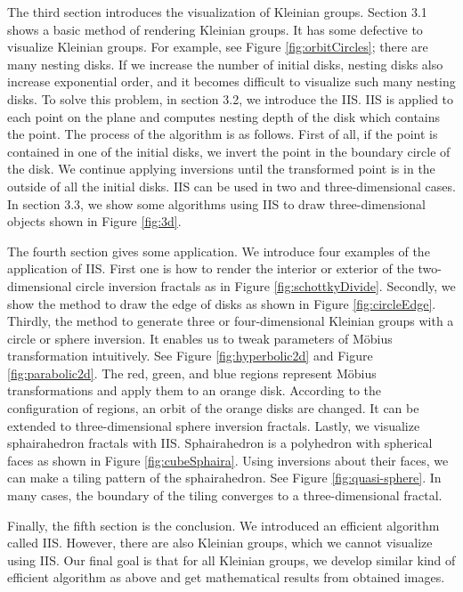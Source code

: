 \documentclass[uplatex, dvipdfmx]{article}
\begin{document}
\noindent The third section introduces the visualization of Kleinian groups.
Section 3.1 shows a basic method of rendering Kleinian groups.
It has some defective to visualize Kleinian groups.
For example, see Figure \ref{fig:orbitCircles}; there are many nesting
disks. If we increase the number of initial disks, nesting disks also
increase exponential order, and it becomes difficult to visualize
such many nesting disks.
To solve this problem, in section 3.2, we introduce the IIS.
IIS is applied to each point on the plane and computes nesting depth of
the disk which contains the point.
The process of the algorithm is as follows.
First of all, if the point is contained in one of the initial disks, we invert the
point in the boundary circle of the disk.
We continue applying inversions until the transformed point is in the
outside of all the initial disks.
IIS can be used in two and three-dimensional cases.
In section 3.3, we show some algorithms using IIS to draw three-dimensional
objects shown in Figure \ref{fig:3d}.

The fourth section gives some application.
We introduce four examples of the application of IIS.
First one is how to render the interior or exterior of the
two-dimensional circle inversion fractals as in Figure \ref{fig:schottkyDivide}.
Secondly, we show the method to draw the edge of disks as shown in
Figure \ref{fig:circleEdge}.
Thirdly, the method to generate three or four-dimensional Kleinian groups with
a circle or sphere inversion. It enables us to tweak parameters of M\"obius
transformation intuitively.
See Figure \ref{fig:hyperbolic2d} and Figure \ref{fig:parabolic2d}.
The red, green, and blue regions represent M\"obius transformations and
apply them to an orange disk.
According to the configuration of regions, an orbit of the orange disks are
changed.
It can be extended to three-dimensional sphere inversion fractals.
Lastly, we visualize sphairahedron fractals with IIS.
Sphairahedron is a polyhedron with spherical
faces as shown in Figure \ref{fig:cubeSphaira}.
Using inversions about their faces, we can make a tiling pattern
of the sphairahedron. See Figure \ref{fig:quasi-sphere}.
In many cases, the boundary of the tiling converges to a
three-dimensional fractal. 

Finally, the fifth section is the conclusion. We introduced an efficient algorithm
called IIS.
However, there are also Kleinian groups, which we cannot
visualize using IIS.
Our final goal is that for all Kleinian groups, we develop similar kind of
efficient algorithm as above and get mathematical results from obtained images.
\end{document}
